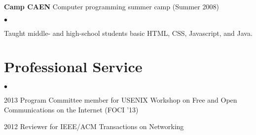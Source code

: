 \documentclass{res}
\newcommand{\sqitem}{\item[\tiny$\blacksquare$]}
\newcommand{\sqlist}{\begin{list}{$\bullet$}
  { \setlength{\itemsep}{0pt}
	\setlength{\parsep}{0pt}
	\setlength{\topsep}{0pt}
	\setlength{\partopsep}{0pt}
	\setlength{\leftmargin}{6.0em}
	\setlength{\labelsep}{2.5em} } }
\newcommand{\sqend}{\end{list}}
\begin{document}
\begin{resume}
    \textbf{Camp CAEN} Computer programming summer camp (Summer 2008)
        \sqlist
        \sqitem Taught middle- and high-school students basic HTML, CSS, Javascript, and Java.
        \sqend

\section{Professional Service}
    \sqlist
    \sqitem 2013 Program Committee member for USENIX Workshop on Free and Open Communications on the Internet (FOCI '13)
    \sqitem 2012 Reviewer for IEEE/ACM Transactions on Networking
    \sqend


\end{resume}
\end{document}
